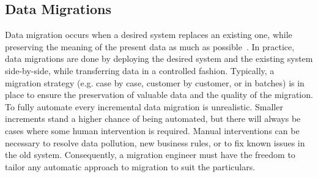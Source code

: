 \documentclass[runningheads]{llncs}
\begin{document}
\subsection{Data Migrations}
   Data migration occurs when a desired system replaces an existing one,
   while preserving the meaning of the present data as much as possible~\cite{Spivak2012}.
   In practice, data migrations are done by deploying the desired system and the existing system side-by-side,
   while transferring data in a controlled fashion.
   Typically, a migration strategy (e.g. case by case, customer by customer, or in batches) is in place
   to ensure the preservation of valuable data and the quality of the migration.
   To fully automate every incremental data migration is unrealistic.
   Smaller increments stand a higher chance of being automated, but there will always be cases where some human intervention is required.
   Manual interventions can be necessary to resolve data pollution, new business rules, or to fix known issues in the old system.
   Consequently, a migration engineer must have the freedom to tailor any automatic approach to migration to suit the particulars.
   
\end{document}
